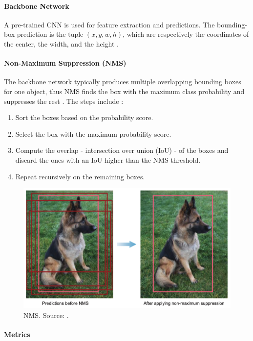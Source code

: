 \documentclass[a4paper, 11pt, oneside]{article}
\begin{document}
\paragraph{Backbone Network}

A pre-trained CNN is used for feature extraction and predictions. The bounding-box prediction is the tuple
$(x, y, w, h)$, which are respectively the coordinates of the center, the width, and the height
\cite{elgendy2020deep, geron2019hands}.

\paragraph{Non-Maximum Suppression (NMS)}

The backbone network typically produces multiple overlapping bounding boxes for one object, thus NMS finds
the box with the maximum class probability and suppresses the rest \cite{elgendy2020deep}. The steps include
\cite{bodla2017soft}:

\begin{enumerate}
  \item Sort the boxes based on the probability score.
  \item Select the box with the maximum probability score.
  \item Compute the overlap - intersection over union (IoU) - of the boxes and discard the ones with an IoU higher than
  the NMS threshold.
  \item Repeat recursively on the remaining boxes.
\end{enumerate}

\begin{figure}[ht]
  \begin{center}
    \includegraphics[width=.6\textwidth]{nms.png}
  \end{center}
  \caption{NMS. Source: \cite{elgendy2020deep}.}
\end{figure}

\paragraph{Metrics}
\end{document}
